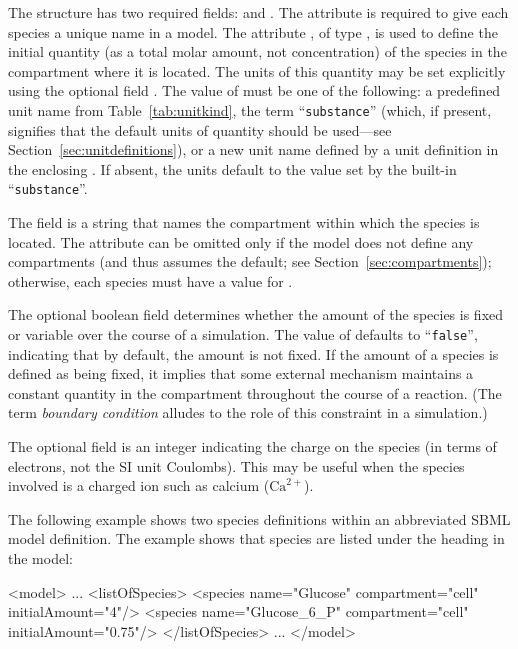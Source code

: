 \documentclass[10pt]{cekarticle}
\newcommand{\changed}[1]{\textcolor{BrickRed}{#1}}
\newenvironment{blockChanged}{\color{BrickRed}}{}
\begin{document}
\begin{blockChanged}
The  structure has two required fields: 
and .  The attribute  is required to
give each species a unique name in a model.  The attribute
, of type , is used to define the
initial quantity (as a total molar amount, not concentration) of the
species in the compartment where it is located.  The units of this quantity
may be set explicitly using the optional field .  The
value of  must be one of the following: a predefined unit
name from Table~\ref{tab:unitkind}, the term ``\texttt{substance}'' (which,
if present, signifies that the default units of quantity should be
used---see Section~\ref{sec:unitdefinitions}), or a new unit name defined
by a unit definition in the enclosing .  If absent, the
units default to the value set by the built-in ``\texttt{substance}''.

The field  is a string that names the compartment
within which the species is located.  The attribute can be omitted only if
the model does not define any compartments (and thus assumes the default;
see Section~\ref{sec:compartments}); otherwise, each species must have a
value for .
\end{blockChanged}

The optional boolean field  determines whether
the amount of the \changed{species} is fixed or variable over the course of
a simulation.  The value of  defaults to
``\texttt{false}'', indicating that by default, the amount is not fixed.
\changed{If the amount of a species is defined as being fixed, it
implies that some external mechanism maintains a constant quantity in the
compartment throughout the course of a reaction.  (The term \emph{boundary
  condition} alludes to the role of this constraint in a simulation.)}

The optional field  is an integer indicating the charge on
the species (in terms of electrons, not the SI unit Coulombs).  This may be
useful when the \changed{species} involved is a charged ion such as calcium
(\changed{$\text{Ca}^{2+}$}).

The following example shows two \changed{species} definitions within an
abbreviated SBML model definition.  The example shows that species are
listed under the heading  in the model:

\begin{example}
<model>
    ...
    <listOfSpecies>
        <species name="Glucose" compartment="cell" initialAmount="4"/>
        <species name="Glucose_6_P" compartment="cell" initialAmount="0.75"/>
    </listOfSpecies>
    ...
</model>

\end{example}
\end{document}
